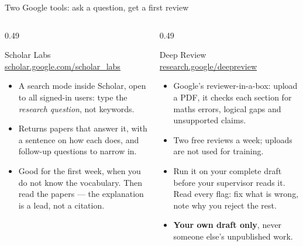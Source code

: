 \documentclass[aspectratio=169,11pt]{beamer}
\newcommand{\lnk}[2]{\href{#1}{\color{brandlight}\underline{#2}}}
\newcommand{\key}[1]{\textbf{\color{brand}#1}}
\begin{document}
\begin{frame}{Two Google tools: ask a question, get a first review}
\begin{columns}[T]
\begin{column}{0.49\textwidth}
\begin{block}{Scholar Labs \quad\footnotesize\lnk{https://scholar.google.com/scholar_labs/search}{scholar.google.com/scholar\_labs}}
\footnotesize
\begin{itemize}
  \item A search mode inside Scholar, open to all signed-in users: type the
        \emph{research question}, not keywords.
  \item Returns papers that answer it, with a sentence on how each does, and
        follow-up questions to narrow in.
  \item Good for the first week, when you do not know the vocabulary. Then
        read the papers --- the explanation is a lead, not a citation.
\end{itemize}
\end{block}
\end{column}
\begin{column}{0.49\textwidth}
\begin{block}{Deep Review \quad\footnotesize\lnk{https://research.google/deepreview/}{research.google/deepreview}}
\footnotesize
\begin{itemize}
  \item Google's reviewer-in-a-box: upload a PDF, it checks each section for
        maths errors, logical gaps and unsupported claims.
  \item Two free reviews a week; uploads are not used for training.
  \item Run it on your complete draft before your supervisor reads it. Read
        every flag: fix what is wrong, note why you reject the rest.
  \item \key{Your own draft only}, never someone else's unpublished work.
\end{itemize}
\end{block}
\end{column}
\end{columns}
\end{frame}
\end{document}

